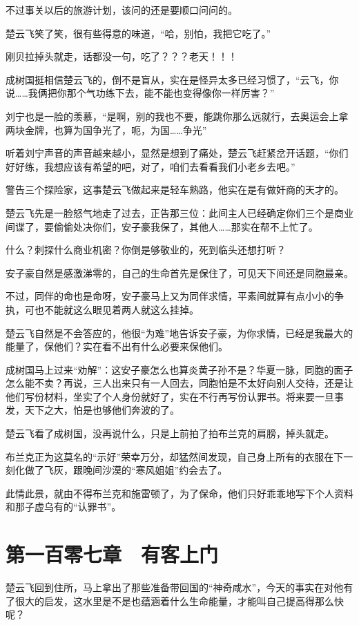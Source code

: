 不过事关以后的旅游计划，该问的还是要顺口问问的。

楚云飞笑了笑，很有些得意的味道，“哈，别怕，我把它吃了。”

刚贝拉掉头就走，话都没一句，吃了？？？老天！！！

成树国挺相信楚云飞的，倒不是盲从，实在是怪异太多已经习惯了，“云飞，你说……我俩把你那个气功练下去，能不能也变得像你一样厉害？”

刘宁也是一脸的羡慕，“是啊，别的我也不要，能跳你那么远就行，去奥运会上拿两块金牌，也算为国争光了，呃，为国……争光”

听着刘宁声音的声音越来越小，显然是想到了痛处，楚云飞赶紧岔开话题，“你们好好练，我想应该有希望的吧，对了，咱们去看看我们小老乡去吧。”

警告三个探险家，这事楚云飞做起来是轻车熟路，他实在是有做奸商的天才的。

楚云飞先是一脸怒气地走了过去，正告那三位：此间主人已经确定你们三个是商业间谍了，要偷偷处决你们，安子豪我保了，其他人……那实在帮不上忙了。

什么？刺探什么商业机密？你倒是够敬业的，死到临头还想打听？

安子豪自然是感激涕零的，自己的生命首先是保住了，可见天下间还是同胞最亲。

不过，同伴的命也是命呀，安子豪马上又为同伴求情，平素间就算有点小小的争执，可也不能就这么眼见着两人就这么挂掉。

楚云飞自然是不会答应的，他很“为难”地告诉安子豪，为你求情，已经是我最大的能量了，保他们？实在看不出有什么必要来保他们。

成树国马上过来“劝解”：这安子豪怎么也算炎黄子孙不是？华夏一脉，同胞的面子怎么能不卖？再说，三人出来只有一人回去，同胞怕是不太好向别人交待，还是让他们写份材料，坐实了个人身份就好了，实在不行再写份认罪书。将来要一旦事发，天下之大，怕是也够他们奔波的了。

楚云飞看了成树国，没再说什么，只是上前拍了拍布兰克的肩膀，掉头就走。

布兰克正为这莫名的“示好”荣幸万分，却猛然间发现，自己身上所有的衣服在下一刻化做了飞灰，跟晚间沙漠的“寒风姐姐”约会去了。

此情此景，就由不得布兰克和施雷顿了，为了保命，他们只好乖乖地写下个人资料和那子虚乌有的“认罪书”。

\section{第一百零七章　有客上门}

楚云飞回到住所，马上拿出了那些准备带回国的“神奇咸水”，今天的事实在对他有了很大的启发，这水里是不是也蕴涵着什么生命能量，才能叫自己提高得那么快呢？

